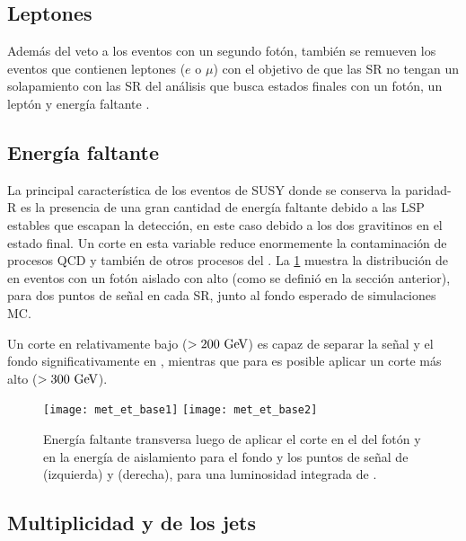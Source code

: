 \subsection{Leptones}\label{sec:leptonphoton_veto}

Además del veto a los eventos con un segundo fotón, también se remueven
los eventos que contienen leptones ($e$ o $\mu$) con el objetivo de que las
SR no tengan un solapamiento con las SR del análisis que busca estados finales
con un fotón, un leptón y energía faltante \cite{ATLAS-CONF-2012-144}.



\subsection{Energía faltante}

La principal característica de los eventos de SUSY donde se conserva
la paridad-R es la presencia de una gran cantidad de energía faltante debido
a las LSP estables que escapan la detección, en este caso debido a los dos gravitinos
en el estado final.
Un corte en esta variable reduce enormemente la contaminación de procesos
QCD y también de otros procesos del {\SM}.
La \cref{fig:opt_met} muestra la distribución de {\met} en eventos con
un fotón aislado con alto {\pt} (como se definió en la sección anterior),
para dos puntos de señal en cada SR, junto al fondo esperado de simulaciones
MC.

Un corte en {\met} relativamente bajo ($> 200 \gev$) es capaz de separar
la señal y el fondo significativamente en {\SRL}, mientras que para {\SRH}
es posible aplicar un corte más alto ($>300\gev$).

\begin{figure}[!h]
  \centering
  \texttt{[image: met\_et\_base1]}
  \texttt{[image: met\_et\_base2]}
  \caption{Energía faltante transversa
    luego de aplicar el corte en el {\pt} del fotón y en la energía de aislamiento
    para el fondo y los puntos de señal de {\SRL} (izquierda) y {\SRH} (derecha),
    para una luminosidad integrada de {\ilumi}.}

  \label{fig:opt_met}
\end{figure}



\subsection{Multiplicidad y {\pt} de los jets} \label{sec:opt_njet}

